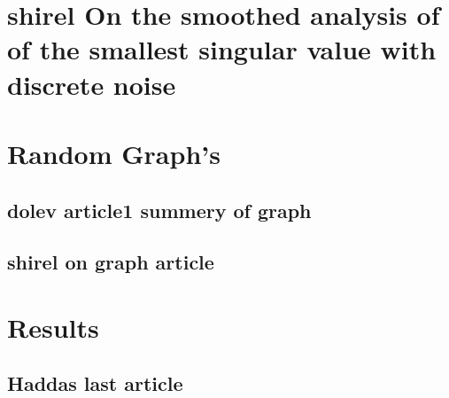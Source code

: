 \documentclass[12pt]{article}
\begin{document}


\section{shirel On the smoothed analysis of of the smallest singular value with discrete noise}



\section{Random Graph's}

\subsection{dolev article1 summery of graph}



\subsection{shirel on graph article}



\section{Results}

\subsection{Haddas last article}



\newpage
\printbibliography
\end{document}
